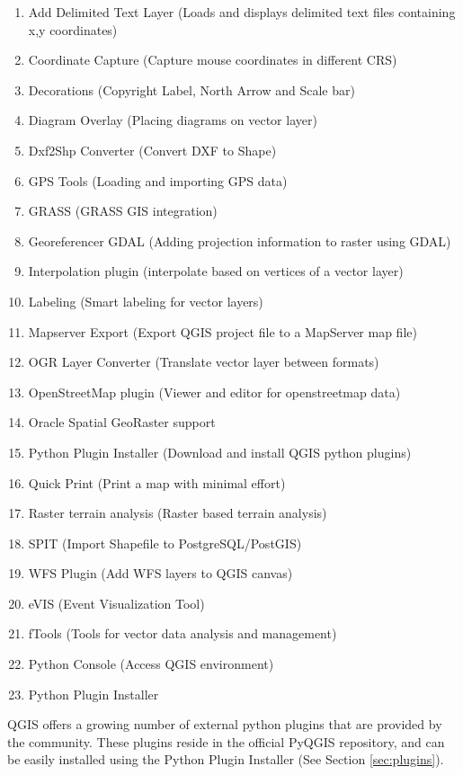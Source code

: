 
\begin{enumerate}
\item Add Delimited Text Layer (Loads and displays delimited text files
containing x,y coordinates)
\item Coordinate Capture (Capture mouse coordinates in different CRS)
\item Decorations (Copyright Label, North Arrow and Scale bar)
\item Diagram Overlay (Placing diagrams on vector layer)
\item Dxf2Shp Converter (Convert DXF to Shape)
\item GPS Tools (Loading and importing GPS data)
\item GRASS (GRASS GIS integration)
\item Georeferencer GDAL (Adding projection information to raster using GDAL)
\item Interpolation plugin (interpolate based on vertices of a vector layer)
\item Labeling (Smart labeling for vector layers)
\item Mapserver Export (Export QGIS project file to a MapServer map file)
\item OGR Layer Converter (Translate vector layer between formats)
\item OpenStreetMap plugin (Viewer and editor for openstreetmap data)
\item Oracle Spatial GeoRaster support
\item Python Plugin Installer (Download and install QGIS python plugins)
\item Quick Print (Print a map with minimal effort)
\item Raster terrain analysis (Raster based terrain analysis)
\item SPIT (Import Shapefile to PostgreSQL/PostGIS)
\item WFS Plugin (Add WFS layers to QGIS canvas)
\item eVIS (Event Visualization Tool)
\item fTools (Tools for vector data analysis and management)
\item Python Console (Access QGIS environment)
\item Python Plugin Installer
\end{enumerate}


QGIS offers a growing number of external python plugins that are provided by
the community. These plugins reside in the official PyQGIS repository, and
can be easily installed using the Python Plugin Installer (See Section
\ref{sec:plugins}).

